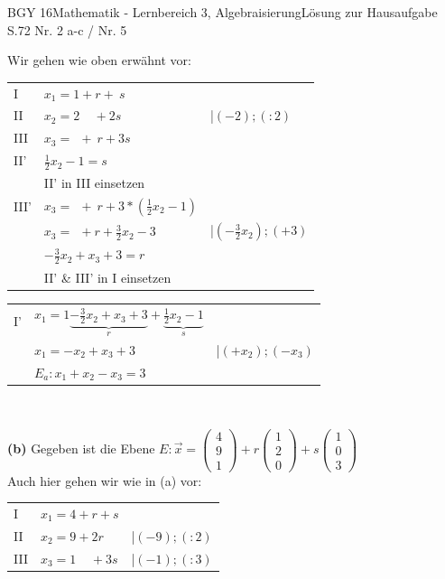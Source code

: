 \documentclass[oneside,openany,headings=optiontotoc,11pt,numbers=noenddot]{scrreprt}
\begin{document}
\begin{worksheet}{BGY 16}{Mathematik - Lernbereich 3, Algebraisierung}{Lösung zur Hausaufgabe S.72 Nr. 2 a-c / Nr. 5}
\begin{framed}
			Wir gehen wie oben erwähnt vor:\\
			\begin{tabularx}{\textwidth}{lll}
				I & \(x_1 = 1 + r + \ s\)\\
				II & \(x_2 = 2\ \ \ \ \ + 2s\) & |\((-2); (:2)\)\\
				III& \(x_3 =\ \ +\ r+ 3s\)\\
				\hline
				II'& \(\frac{1}{2}x_2 - 1 = s\)\\
				& \multicolumn{2}{l}{II' in III einsetzen}\\
				III' & \(x_3 =\ \ +\ r+ 3*(\frac{1}{2}x_2 - 1)\)\\
				& \(x_3 =\ \ + r + \frac{3}{2}x_2 - 3\) & |\((-\frac{3}{2}x_2); (+3)\)\\
				& \(-\frac{3}{2}x_2 + x_3 + 3 = r\)\\
				& \multicolumn{2}{l}{II' \& III' in I einsetzen}\\
			\end{tabularx}
			\begin{tabularx}{\textwidth}{lll}
				I' & \(x_1 = 1 \underbrace{-\frac{3}{2}x_2 + x_3 + 3}_{r} + \underbrace{\frac{1}{2}x_2 - 1}_{s}\)\\
				& \(x_1 = -x_2 + x_3 +3\) & |\((+x_2);(-x_3)\)\\
				& \colorbox{green!10}{\(E_a: x_1 + x_2 - x_3 = 3\)}
			\end{tabularx}\\
			\par
			\textbf{(b)} Gegeben ist die Ebene \(E:\vec{x} = \left(\begin{array}{c}4\\9\\1\end{array}\right) + r\left(\begin{array}{c}1\\2\\0\end{array}\right) + s\left(\begin{array}{c}1\\0\\3\end{array}\right)\)\\
			Auch hier gehen wir wie in (a) vor:\\
			\begin{tabularx}{\textwidth}{lll}
				I & \(x_1 = 4 + r + s\)\\
				II & \(x_2 = 9 + 2r\) & |\((-9); (:2)\)\\
				III& \(x_3 =1\ \ \ \ \ + 3s\) & |\((-1);(:3)\)\\

\end{tabularx}
\end{framed}
\end{worksheet}
\end{document}

